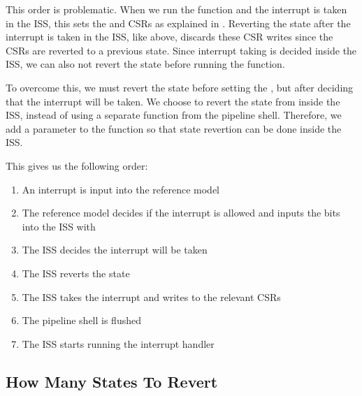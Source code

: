 This order is problematic. When we run the  function and the interrupt is taken in the ISS, this sets the  and  CSRs as explained in . Reverting the state after the interrupt is taken in the ISS, like above, discards these CSR writes since the CSRs are reverted to a previous state. Since interrupt taking is decided inside the ISS, we can also not revert the state before running the  function.

To overcome this, we must revert the state before setting the , but after deciding that the interrupt will be taken. We choose to revert the state from inside the ISS, instead of using a separate  function from the pipeline shell. Therefore, we add a  parameter to the  function so that state revertion can be done inside the ISS.

This gives us the following order:

\begin{enumerate}
    \item An interrupt is input into the reference model
    \item The reference model decides if the interrupt is allowed and inputs the  bits into the ISS with 
    \item The ISS decides the interrupt will be taken
    \item The ISS reverts the state
    \item  The ISS takes the interrupt and writes to the relevant CSRs
    \item The pipeline shell is flushed
    \item The ISS starts running the interrupt handler
\end{enumerate}

\subsection{How Many States To Revert}

